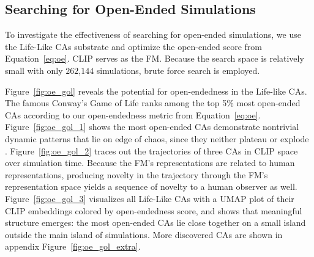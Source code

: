 \documentclass{article}
\begin{document}
\subsection{Searching for Open-Ended Simulations}
To investigate the effectiveness of searching for open-ended simulations, we use the Life-Like CAs substrate and optimize the open-ended score from Equation~\ref{eq:oe}.
CLIP serves as the FM.
Because the search space is relatively small with only $262$,$144$ simulations, brute force search is employed.

Figure~\ref{fig:oe_gol} reveals the potential for open-endedness in the Life-like CAs.
The famous Conway's Game of Life ranks among the top 5\% most open-ended CAs according to our open-endedness metric from Equation~\ref{eq:oe}.
Figure~\ref{fig:oe_gol_1} shows the most open-ended CAs demonstrate nontrivial dynamic patterns that lie on edge of chaos, since they neither plateau or explode \citep{wolfram2003new}.
Figure~\ref{fig:oe_gol_2} traces out the trajectories of three CAs in CLIP space over simulation time.
Because the FM's representations are related to human representations, producing novelty in the trajectory through the FM's representation space yields a sequence of novelty to a human observer as well.
Figure~\ref{fig:oe_gol_3} visualizes all Life-Like CAs with a UMAP plot of their CLIP embeddings colored by open-endedness score, and shows that meaningful structure emerges: the most open-ended CAs lie close together on a small island outside the main island of simulations.
More discovered CAs are shown in appendix Figure~\ref{fig:oe_gol_extra}.
\end{document}
